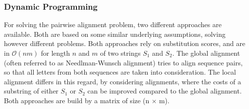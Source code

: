 \subsubsection{Dynamic Programming}
For solving the pairwise alignment problem, two different approaches are available. Both are based on some similar underlying assumptions, solving however different problems. Both approaches rely on substitution scores, and are in  $\mathcal{O}({n m})$ for length $n$ and $m$ of two strings $S_1$ and $S_2$. The global alignment (often referred to as Needlman-Wunsch alignment) tries to align sequence pairs, so that all letters from both sequences are taken into consideration. The local alignment differs in this regard, by considering alignments, where the costs of a substring of either $S_1$ or $S_2$ can be improved compared to the global alignment. Both approaches are build by a matrix of size (n $\times $ m).
